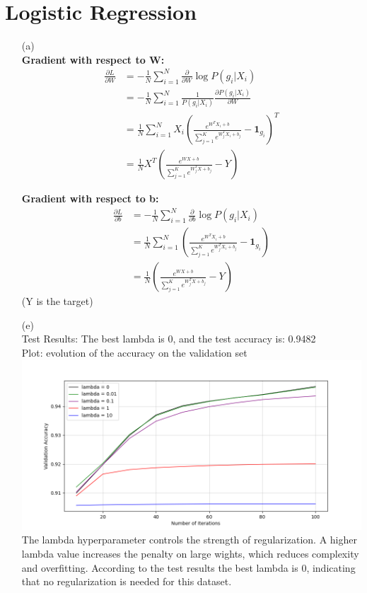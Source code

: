 \documentclass[12pt]{article}
\begin{document}
\section*{Logistic Regression}
\label{sec:logistic}
\begin{enumerate}
    \item[(a)]\\
    \textbf{Gradient with respect to W:}
\begin{align*}
\frac{\partial L}{\partial W} &= -\frac{1}{N}\sum_{i=1}^{N} \frac{\partial}{\partial W} \log P(g_i|X_i)\\
&= -\frac{1}{N}\sum_{i=1}^{N} \frac{1}{P(g_i|X_i)} \frac{\partial P(g_i|X_i)}{\partial W}\\
&= \frac{1}{N}\sum_{i=1}^{N} X_i \left(\frac{e^{W^T X_i + b}}{\sum_{j=1}^{K} e^{W_j^T X_i + b_j}} - \mathbf{1}_{g_i}\right)^T\\
&= \frac{1}{N} X^T \left(\frac{e^{WX + b}}{\sum_{j=1}^{K} e^{W_j^T X + b_j}} - Y\right)
\end{align*}

\textbf{Gradient with respect to b:}
\begin{align*}
    \frac{\partial L}{\partial b} &= -\frac{1}{N}\sum_{i=1}^{N} \frac{\partial}{\partial b} \log P(g_i|X_i)\\
    &= \frac{1}{N}\sum_{i=1}^{N} \left(\frac{e^{W^T X_i + b}}{\sum_{j=1}^{K} e^{W_j^T X_i + b_j}} - \mathbf{1}_{g_i}\right)\\
    &= \frac{1}{N}\left(\frac{e^{WX + b}}{\sum_{j=1}^{K} e^{W_j^T X + b_j}} - Y\right)
\end{align*}
(Y is the target)
\item[(e)]\\
Test Results: The best lambda is 0, and the test accuracy is: 0.9482\\
Plot: evolution of the accuracy on the validation set\\
\includegraphics[width=1\textwidth]{logistic_regression_validation_accuracy.png}\\
    The lambda hyperparameter controls the strength of regularization. A higher lambda value increases the penalty on large wights, which reduces complexity and overfitting.
    According to the test results the best lambda is 0, indicating that no regularization is needed for this dataset.
    \end{enumerate}
\end{document}

